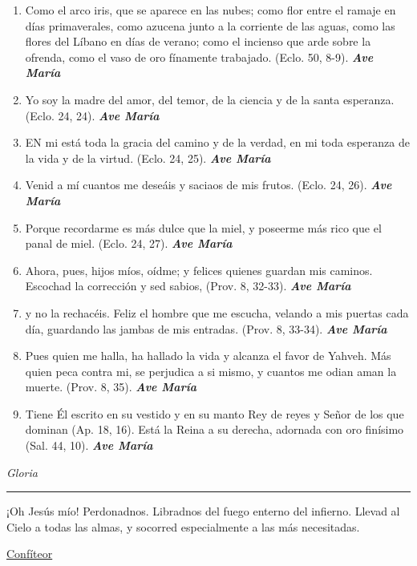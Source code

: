 \documentclass[a4paper,11pt, oneside]{report}
\begin{document}
{{\begin{enumerate}
        \item Como el arco iris, que se aparece en las nubes; como flor entre el ramaje en días primaverales, como azucena junto
        a la corriente de las aguas, como las flores del Líbano en días de verano; como el incienso que arde sobre la ofrenda,
        como el vaso de oro fínamente trabajado. (Eclo. 50, 8-9). \textbf{\textit{Ave María}}

        \item Yo soy la madre del amor, del temor, de la ciencia y de la santa esperanza. 
        (Eclo. 24, 24). \textbf{\textit{Ave María}}

        \item EN mi está toda la gracia del camino y de la verdad, en mi toda esperanza de la vida y de la virtud. 
        (Eclo. 24, 25). \textbf{\textit{Ave María}}

        \item Venid a mí cuantos me deseáis y saciaos de mis frutos. 
        (Eclo. 24, 26). \textbf{\textit{Ave María}}

        \item Porque recordarme es más dulce que la miel, y poseerme más rico que el panal de miel. 
        (Eclo. 24, 27). \textbf{\textit{Ave María}}

        \item Ahora, pues, hijos míos, oídme; y felices quienes guardan mis caminos. Escochad la corrección y sed sabios, 
        (Prov. 8, 32-33). \textbf{\textit{Ave María}}

        \item y no la rechacéis. Feliz el hombre que me escucha, velando a mis puertas cada día, guardando las jambas de mis entradas. 
        (Prov. 8, 33-34). \textbf{\textit{Ave María}}

        \item Pues quien me halla, ha hallado la vida y alcanza el favor de Yahveh. Más quien peca contra mi, se perjudica a si mismo,
        y cuantos me odian aman la muerte. (Prov. 8, 35). \textbf{\textit{Ave María}}

        \item Tiene Él escrito en su vestido y en su manto Rey de reyes y Señor de los que dominan (Ap. 18, 16).
        Está la Reina a su derecha, adornada con oro finísimo (Sal. 44, 10). \textbf{\textit{Ave María}}
      \end{enumerate}      

      \indent\textit{Gloria} \par      

      \begin{center}\rule{1\linewidth}{\linethickness}\end{center}      

      \medskip
      \hypertarget{finalCoronacion}{¡Oh Jesús mío! Perdonadnos. Libradnos del fuego enterno del infierno. Llevad al Cielo a todas las almas, y socorred especialmente a las más 
      necesitadas.}
    }

  \par\bigskip
  \hyperlink{sec:confiteor}{Confíteor}
}
\end{document}
